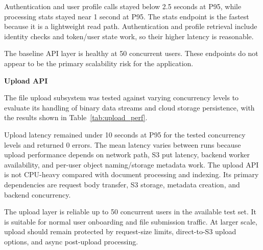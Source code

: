 Authentication and user profile calls stayed below 2.5 seconds at P95, while processing stats stayed near 1 second at P95. The stats endpoint is the fastest because it is a lightweight read path. Authentication and profile retrieval include identity checks and token/user state work, so their higher latency is reasonable.

The baseline API layer is healthy at 50 concurrent users. These endpoints do not appear to be the primary scalability risk for the application.

\textbf{Upload API}

The file upload subsystem was tested against varying concurrency levels to evaluate its handling of binary data streams and cloud storage persistence, with the results shown in Table~\ref{tab:upload_perf}.

\begin{table}[H]
    \centering
    \caption{Upload API Performance Matrix.}
    \label{tab:upload_perf}
\end{table}

Upload latency remained under 10 seconds at P95 for the tested concurrency levels and returned 0 errors. The mean latency varies between runs because upload performance depends on network path, S3 put latency, backend worker availability, and per-user object naming/storage metadata work. The upload API is not CPU-heavy compared with document processing and indexing. Its primary dependencies are request body transfer, S3 storage, metadata creation, and backend concurrency.

The upload layer is reliable up to 50 concurrent users in the available test set. It is suitable for normal user onboarding and file submission traffic. At larger scale, upload should remain protected by request-size limits, direct-to-S3 upload options, and async post-upload processing.

